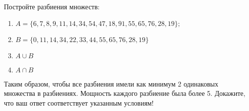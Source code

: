 \question
Постройте разбиения множеств:
\begin{enumerate}
	\renewcommand{\labelenumi}{\alph{enumi})}
	\item $A = \{6, 7, 8, 9, 11, 14, 34, 54, 47, 18, 91, 55, 65, 76, 28, 19\};$
	\item $B = \{0, 11, 14, 34, 22, 33, 44, 55, 65, 76, 28, 19\}$
	\item $A \cup B$
	\item $A \cap B$
\end{enumerate}
Таким образом, чтобы все разбиения имели как минимум 2 одинаковых множества в разбиениях.
Мощность каждого разбиение была более 5.
Докажите, что ваш ответ соответствует указанным условиям!
